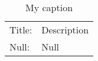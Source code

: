 \begin{table}[]
\centering
\caption{My caption}
\label{my-label}
\begin{tabular}{ll}
Title: & Description \\
Null:  & Null
\end{tabular}
\end{table}
